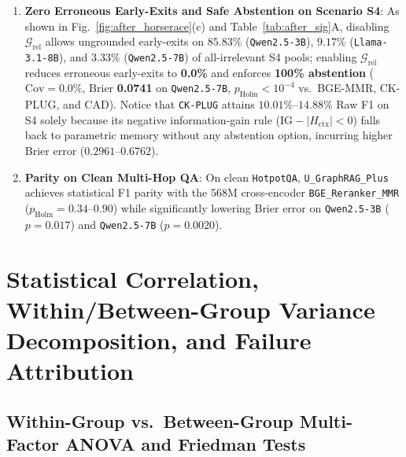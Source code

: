 \documentclass[11pt]{article}
\begin{document}
\begin{enumerate}[leftmargin=*,nosep]
    \item \textbf{Zero Erroneous Early-Exits and Safe Abstention on Scenario S4}: As shown in Fig.~\ref{fig:after_horserace}(c) and Table~\ref{tab:after_sig}A, disabling $\mathcal{G}_{\text{rel}}$ allows ungrounded early-exits on $85.83\%$ (\texttt{Qwen2.5-3B}), $9.17\%$ (\texttt{Llama-3.1-8B}), and $3.33\%$ (\texttt{Qwen2.5-7B}) of all-irrelevant S4 pools; enabling $\mathcal{G}_{\text{rel}}$ reduces erroneous early-exits to \textbf{0.0\%} and enforces \textbf{100\% abstention} ($\text{Cov}=0.0\%$, Brier \textbf{0.0741} on \texttt{Qwen2.5-7B}, $p_{\text{Holm}}<10^{-4}$ vs.\ BGE-MMR, CK-PLUG, and CAD). Notice that \texttt{CK-PLUG} attains $10.01\%\text{--}14.88\%$ Raw F1 on S4 solely because its negative information-gain rule ($\text{IG} - |H_{\text{ctx}}| < 0$) falls back to parametric memory without any abstention option, incurring higher Brier error ($0.2961\text{--}0.6762$).
    \item \textbf{Parity on Clean Multi-Hop QA}: On clean \texttt{HotpotQA}, \texttt{U\_GraphRAG\_Plus} achieves statistical F1 parity with the 568M cross-encoder \texttt{BGE\_Reranker\_MMR} ($p_{\text{Holm}}=0.34\text{--}0.90$) while significantly lowering Brier error on \texttt{Qwen2.5-3B} ($p=0.017$) and \texttt{Qwen2.5-7B} ($p=0.0020$).
\end{enumerate}

\section{Statistical Correlation, Within/Between-Group Variance Decomposition, and Failure Attribution}

\subsection{Within-Group vs.\ Between-Group Multi-Factor ANOVA and Friedman Tests}
\end{document}
